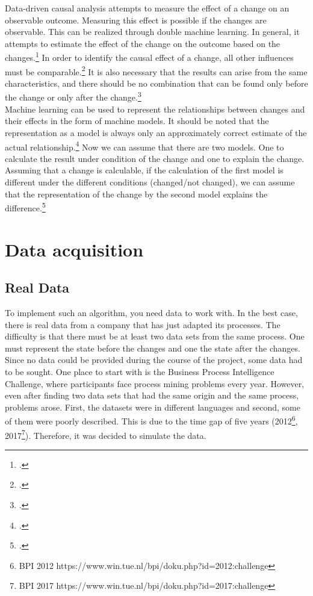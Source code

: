     Data-driven causal analysis attempts to measure the effect of a change on an observable outcome. Measuring this effect is possible if the changes are observable. This can be realized through double machine learning. In general, it attempts to estimate the effect of the change on the outcome based on the changes.\footcite[see][106]{mahu2020} In order to identify the causal effect of a change, all other influences must be comparable.\footcite[see][107]{mahu2020} It is also necessary that the results can arise from the same characteristics, and there should be no combination that can be found only before the change or only after the change.\footcite[see][109]{mahu2020}\\
    Machine learning can be used to represent the relationships between changes and their effects in the form of machine models. It should be noted that the representation as a model is always only an approximately correct estimate of the actual relationship.\footcite[see][111]{mahu2020} Now we can assume that there are two models. One to calculate the result under condition of the change and one to explain the change. Assuming that a change is calculable, if the calculation of the first model is different under the different conditions (changed/not changed), we can assume that the representation of the change by the second model explains the difference.\footcite[see][112\psqq]{mahu2020}
\clearpage
\chapter{Data acquisition}

    \section{Real Data}
    To implement such an algorithm, you need data to work with. In the best case, there is real data from a company that has just adapted its processes. The difficulty is that there must be at least two data sets from the same process. One must represent the state before the changes and one the state after the changes.\\
    Since no data could be provided during the course of the project, some data had to be sought. One place to start with is the Business Process Intelligence Challenge, where participants face process mining problems every year. However, even after finding two data sets that had the same origin and the same process, problems arose. First, the datasets were in different languages and second, some of them were poorly described. This is due to the time gap of five years (2012\footnote{BPI 2012 https://www.win.tue.nl/bpi/doku.php?id=2012:challenge}, 2017\footnote{BPI 2017 https://www.win.tue.nl/bpi/doku.php?id=2017:challenge}). Therefore, it was decided to simulate the data.

